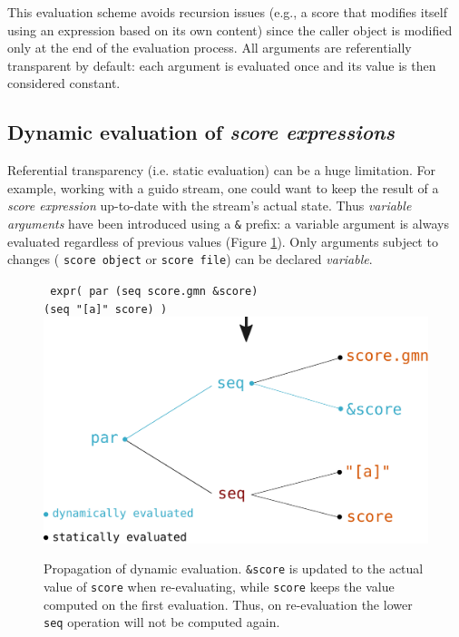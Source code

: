 \documentclass{article}
\newcommand{\OSC}[1]{{\fontsize{9.5pt}{10pt} \selectfont\texttt{#1}}}
\newcommand{\oper}[1]{\textcolor{figRed}{#1}}
\newcommand{\param}[1]{\textcolor{figOrange}{#1}}
\newcommand{\prefix}[1]{\textcolor{figBlue}{#1}}
\newcommand{\sExpr}{\emph{score expressions}}
\newcommand{\tab}{\hspace*{4mm}}
\begin{document}
{This evaluation scheme avoids recursion issues (e.g., a score that modifies itself using an expression based on its own content) since the caller object is modified only at the end of the evaluation process. All arguments are referentially transparent by default: each argument is evaluated once and its value is then considered constant.

\subsection{Dynamic evaluation of \sExpr}

Referential transparency (i.e. static evaluation) can be a huge limitation. For example, working with a guido stream, one could want to keep the result of a \emph{score expression} up-to-date with the stream's actual state.
Thus \emph{variable arguments} have been introduced using a \OSC{\&} prefix: a variable argument is always evaluated regardless of previous values (Figure \ref{fig:dynamicEval}). Only arguments subject to changes (\OSC{score object} or \OSC{score file}) can be declared \emph{variable}.

\begin{figure}[th]
\centering
\OSC{ expr( \oper{par} (\oper{seq} \param{score.gmn} \prefix{\&}\param{score}) \\
 \tab\tab\tab\tab (\oper{seq} \param{"[a]" score}) )}
\includegraphics[width=0.9\columnwidth]{imgs/dynamicEval}
\caption{Propagation of dynamic evaluation. \OSC{\prefix{\&}\param{score}} is updated to the actual value of \OSC{score} when re-evaluating, while \OSC{\param{score}} keeps the value computed on the first evaluation. Thus, on re-evaluation the lower \OSC{\oper{seq}} operation will not be computed again. 
\label{fig:dynamicEval}}
\end{figure}

}
\end{document}
